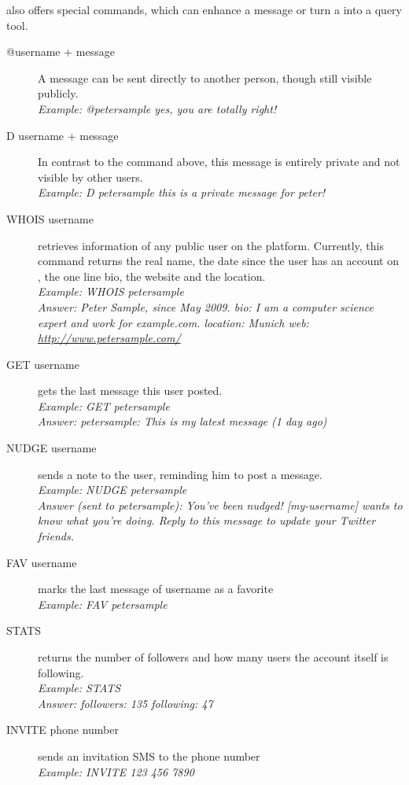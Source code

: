 \begin{description}
                \Twitter{} also offers special commands, which can enhance a
                message or turn a \Twitter{} into a query tool.
  \begin{description}
    \item[@username + message]
      A message can be sent directly to another person, though still visible
      publicly.\\
      \textit{Example: @petersample yes, you are totally right!}

    \item[D username + message]
      In contrast to the command above, this message is entirely private and
      not visible by other users.\\
      \textit{Example: D petersample this is a private message for peter!}

    \item[WHOIS username]
      retrieves information of any public user on the \Twitter{} platform.
      Currently, this command returns the real name, the date since the user
      has an account on \Twitter{}, the one line bio, the website and the
      location.\\
      \textit{Example: WHOIS petersample}\\
      \textit{Answer: Peter Sample, since May 2009. bio: I am a computer
              science expert and work for example.com. location: Munich web:
              \url{http://www.petersample.com/}}

    \item[GET username]
      gets the last message this user posted.\\
      \textit{Example: GET petersample}\\
      \textit{Answer: petersample: This is my latest message (1 day ago)}

    \item[NUDGE username]
      sends a note to the user, reminding him to post a message.\\
      \textit{Example: NUDGE petersample}\\
      \textit{Answer (sent to petersample): You've been nudged! [my-username] wants to know what you're doing. Reply to this
      message to update your Twitter friends.}

    \item[FAV username]
      marks the last message of username as a favorite\\
      \textit{Example: FAV petersample}

    \item[STATS]
      returns the number of followers and how many users the account itself is
      following.\\
      \textit{Example: STATS}\\
      \textit{Answer: followers: 135 following: 47}

    \item[INVITE phone number]
      sends an invitation SMS to the phone number\\
      \textit{Example: INVITE 123 456 7890}

\end{description}
\end{description}

